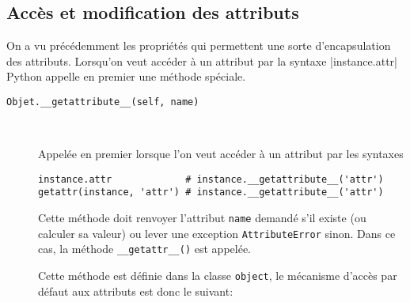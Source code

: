 \subsection{Accès et modification des attributs}
On a vu précédemment les propriétés qui permettent une sorte d'encapsulation des attributs. Lorsqu'on veut accéder à un attribut par la syntaxe |instance.attr| Python appelle en premier une méthode spéciale.

\begin{description}
    \item[\texttt{Objet.__getattribute__(self, name)}]~
    
    Appelée en premier lorsque l'on veut accéder à un attribut par les syntaxes
    \begin{verbatim}
instance.attr             # instance.__getattribute__('attr')
getattr(instance, 'attr') # instance.__getattribute__('attr')
    \end{verbatim} 
    Cette méthode doit renvoyer l'attribut \texttt{name} demandé s'il existe (ou calculer sa valeur) ou lever une exception \texttt{AttributeError} sinon. Dans ce cas, la méthode \texttt{__getattr__()} est appelée.\medskip
    
    Cette méthode est définie dans la classe \texttt{object}, le mécanisme d'accès par défaut aux attributs est
    donc le suivant:


\end{description}
